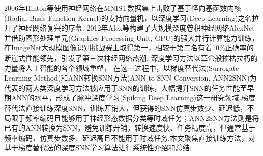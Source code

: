 \documentclass{SCIS2020cn}
\begin{document}
2006年Hinton等\cite{10.1162/neco.2006.18.7.1527}使用神经网络在MNIST数据集\cite{MNIST}上击败了基于径向基函数内核(Radial Basis Function Kernel)的支持向量机，以深度学习(Deep Learning)之名拉开了神经网络复兴的序幕\cite{Goodfellow-et-al-2016}.
2012年Alex等\cite{NIPS2012_c399862d}构建了大规模深度卷积神经网络AlexNet并借助图形处理单元(Graphics Processing Unit, GPU)的强大并行计算能力训练，在ImageNet大规模图像识别挑战赛\cite{russakovsky2015imagenet}上取得第一，相较于第二名有着10\%正确率的断崖式性能领先，引发了第三次神经网络热潮.
深度学习方法以革命般摧枯拉朽的力量将人工智能的各个领域重塑，%
在这一过程中，以梯度替代法(Surrogate Learning Method)\cite{neftci2019surrogate}和ANN转换SNN方法(ANN to SNN Conversion, ANN2SNN)\cite{cao2015spiking}为代表的两大类深度学习方法被应用于SNN的训练，大幅提升SNN的任务性能至早期ANN的水平\cite{TAVANAEI201947}，形成了脉冲深度学习(Spiking Deep Learning)这一研究领域.梯度替代法直接训练深度SNN，训练开销大，但获得的SNN仿真步数少、延迟低，不局限于频率编码且能够用于神经形态数据分类等时域任务；ANN2SNN方法则是将已有的ANN转换为SNN，避免训练开销，转换速度快、任务精度高，但通常基于频率编码，仿真步数多、延迟高且不能用于时域任务.本文聚焦直接训练方法，对基于梯度替代法的深度SNN学习算法进行系统性介绍和总结.


\begin{figure}[htbp]
	\centering
	\label{fig: timeline}
\end{figure}
\end{document}
